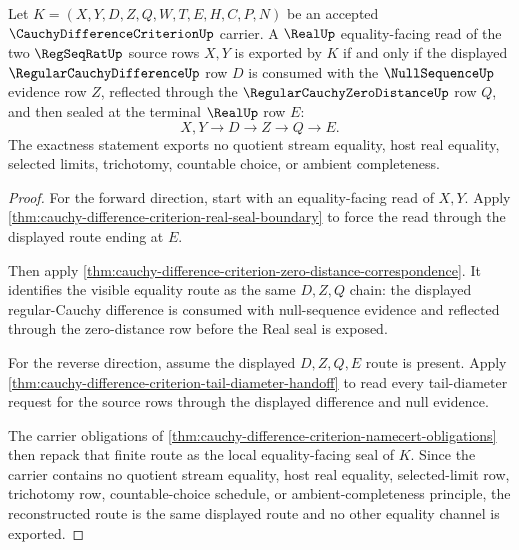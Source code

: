 \begin{theorem}
\label{thm:cauchy-difference-criterion-bidirectional-exactness}
Let $K=(X,Y,D,Z,Q,W,T,E,H,C,P,N)$ be an accepted $\CauchyDifferenceCriterionUp$ carrier. A $\RealUp$ equality-facing read of the two $\RegSeqRatUp$ source rows $X,Y$ is exported by $K$ if and only if the displayed $\RegularCauchyDifferenceUp$ row $D$ is consumed with the $\NullSequenceUp$ evidence row $Z$, reflected through the $\RegularCauchyZeroDistanceUp$ row $Q$, and then sealed at the terminal $\RealUp$ row $E$:
$$
X,Y \longrightarrow D \longrightarrow Z \longrightarrow Q \longrightarrow E .
$$
The exactness statement exports no quotient stream equality, host real equality, selected limits, trichotomy, countable choice, or ambient completeness.
\end{theorem}
\begin{proof}
For the forward direction, start with an equality-facing read of $X,Y$. Apply \autoref{thm:cauchy-difference-criterion-real-seal-boundary} to force the read through the displayed route ending at $E$.

Then apply \autoref{thm:cauchy-difference-criterion-zero-distance-correspondence}. It identifies the visible equality route as the same $D,Z,Q$ chain: the displayed regular-Cauchy difference is consumed with null-sequence evidence and reflected through the zero-distance row before the Real seal is exposed.

For the reverse direction, assume the displayed $D,Z,Q,E$ route is present. Apply \autoref{thm:cauchy-difference-criterion-tail-diameter-handoff} to read every tail-diameter request for the source rows through the displayed difference and null evidence.

The carrier obligations of \autoref{thm:cauchy-difference-criterion-namecert-obligations} then repack that finite route as the local equality-facing seal of $K$. Since the carrier contains no quotient stream equality, host real equality, selected-limit row, trichotomy row, countable-choice schedule, or ambient-completeness principle, the reconstructed route is the same displayed route and no other equality channel is exported.
\end{proof}

